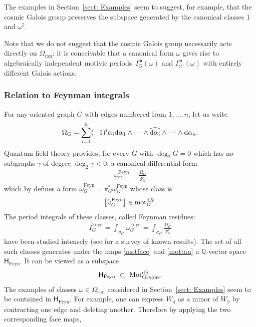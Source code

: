 \documentclass[pdftex]{sigma}%
\numberwithin{equation}{section}
\newcommand{\Q}{\mathbb Q}
\newcommand{\can}{\mathrm{can}}
\newcommand{\mm}{\mathfrak{m}}
\newcommand{\0}{\color{blue}{\mathsf{0}}}
\begin{document}
 The examples in Section~\ref{sect: Examples} seem to suggest, for example, that
 the cosmic Galois group preserves the subspace generated by the canonical classes $1$ and $\omega^5$.

 Note that we do not suggest that the cosmic Galois group necessarily acts directly on $\Omega_{\can}$: it is conceivable that a canonical form $\omega$ gives rise to algebraically independent motivic periods~$I^{\mm}_G(\omega)$ and $ I^{\mm}_{G'}(\omega)$ with entirely different Galois actions.

 \subsubsection{Relation to Feynman integrals}
 For any oriented graph $G$ with edges numbered from $1,\dots, n$, let us write
\begin{gather} \label{OmegaGprojform}
\Omega_G = \sum^n_{i=1} (-1)^i \alpha_i {\rm d}\alpha_1 \wedge \dots \wedge \widehat{{\rm d}\alpha_i} \wedge \dots \wedge {\rm d}\alpha_n.
\end{gather}
 Quantum field theory provides, for every $G$ with $\deg_2 G=0$ which has no subgraphs $\gamma$ of degree $\deg_2 \gamma<0$, a canonical differential form
 \begin{gather*} %
 \omega^{\mathrm{Feyn}}_G = \frac{\Omega_G}{\Psi_G^2}
 \end{gather*}
 which by \cite{BEK} defines a form $\widetilde{\omega}^{\mathrm{Feyn}}_G=\pi_G^* \omega^{\mathrm{Feyn}}_G$ whose class is
 \begin{gather*}
 \big[\widetilde{\omega}^{\mathrm{Feyn}}_G\big] \in \mathrm{mot}^{{\rm d}R}_G.
 \end{gather*}
 The period integrals of these classes, called Feynman residues:
 \begin{gather*}
 I^{\mathrm{Feyn}}_{G} = \int_{\sigma_G} \omega^{\mathrm{Feyn}}_G = \int_{\sigma_G} \frac{\Omega_G}{\Psi_G^2}
 \end{gather*}
 have been studied intensely (see \cite{Schnetz} for a survey of known results).
The set of all such classes generates under the maps \eqref{motface} and \eqref{mottau} a $\Q$-vector space $\mathsf{H}_{\mathrm{Feyn}}$.
It can be viewed as a subspace
\begin{gather*}
 \mathsf{H}_{\mathrm{Feyn}} \ \subset \ \mathrm{Mot^{{\rm d}R}_{Graphs}}.
 \end{gather*}
The examples of classes $\omega \in \mathsf{\Omega}_{\can}$ considered in Section~\ref{sect: Examples} seem to be contained in $\mathsf{H}_{\mathrm{Feyn}}$. For example, one can express $W_4$ as a minor of $W_5$ by contracting one edge and deleting another. Therefore by applying the two corresponding face maps,
\end{document}
